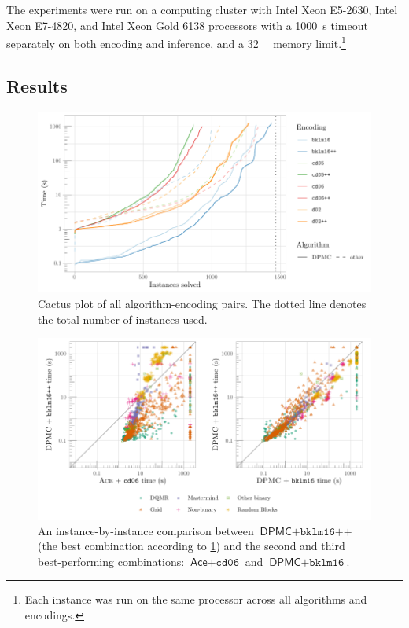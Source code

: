 The experiments were run on a computing cluster with Intel Xeon E5-2630,
Intel Xeon E7-4820, and Intel Xeon Gold 6138 processors with a
\SI{1000}{\second} timeout separately on both encoding and inference, and a
\SI{32}{\gibi\byte} memory limit.\footnote{Each instance was run on the same
  processor across all algorithms and encodings.}

\subsection{Results}

\begin{figure}
  \centering
  \includegraphics[width=\textwidth]{chapters/wmc_without_parameters/cumulative}
  \caption{Cactus plot of all algorithm-encoding pairs. The dotted line denotes
    the total number of instances used.}\label{fig:cumulative2}
\end{figure}

\begin{figure}
  \centering
  \includegraphics[width=\textwidth]{chapters/wmc_without_parameters/scatter}
  \caption{An instance-by-instance comparison between $\textsf{DPMC} +
    \texttt{bklm16++}$ (the best combination according to \cref{fig:cumulative2})
  and the second and third best-performing combinations: $\textsf{Ace} +
  \texttt{cd06}$ and $\textsf{DPMC} + \texttt{bklm16}$.}
  \label{fig:scatter2}
\end{figure}

